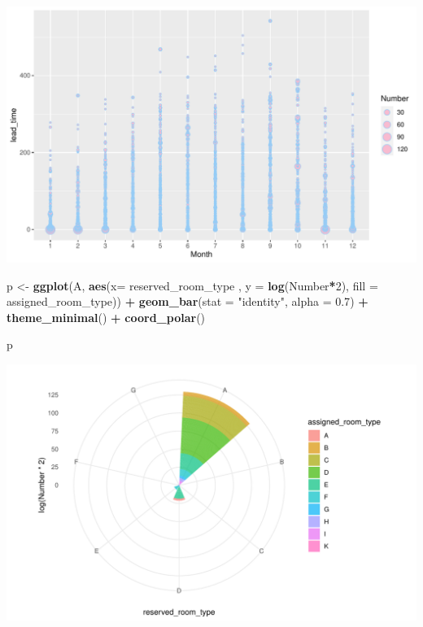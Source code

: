 \documentclass[11pt,a4paper,]{article}
\newenvironment{Shaded}{\begin{snugshade}}{\end{snugshade}}
\newcommand{\DataTypeTok}[1]{\textcolor[rgb]{0.13,0.29,0.53}{#1}}
\newcommand{\DecValTok}[1]{\textcolor[rgb]{0.00,0.00,0.81}{#1}}
\newcommand{\FloatTok}[1]{\textcolor[rgb]{0.00,0.00,0.81}{#1}}
\newcommand{\KeywordTok}[1]{\textcolor[rgb]{0.13,0.29,0.53}{\textbf{#1}}}
\newcommand{\NormalTok}[1]{#1}
\newcommand{\OperatorTok}[1]{\textcolor[rgb]{0.81,0.36,0.00}{\textbf{#1}}}
\newcommand{\StringTok}[1]{\textcolor[rgb]{0.31,0.60,0.02}{#1}}
\begin{document}
\includegraphics{tidy_files/figure-latex/leadtimeplot-1.pdf}

\begin{Shaded}
\begin{Highlighting}[]
\NormalTok{p <-}\StringTok{ }\KeywordTok{ggplot}\NormalTok{(A, }\KeywordTok{aes}\NormalTok{(}\DataTypeTok{x=}\NormalTok{ reserved_room_type , }\DataTypeTok{y =} \KeywordTok{log}\NormalTok{(Number}\OperatorTok{*}\DecValTok{2}\NormalTok{), }\DataTypeTok{fill =}\NormalTok{ assigned_room_type)) }\OperatorTok{+}
\StringTok{  }\KeywordTok{geom_bar}\NormalTok{(}\DataTypeTok{stat =} \StringTok{"identity"}\NormalTok{, }\DataTypeTok{alpha =} \FloatTok{0.7}\NormalTok{) }\OperatorTok{+}
\StringTok{ }\KeywordTok{theme_minimal}\NormalTok{() }\OperatorTok{+}
\StringTok{  }\KeywordTok{coord_polar}\NormalTok{() }
  

\NormalTok{p  }
\end{Highlighting}
\end{Shaded}

\includegraphics{tidy_files/figure-latex/coordplot-1.pdf}
\end{document}
